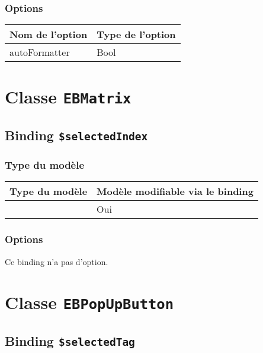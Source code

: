 \subsubsection{Options}

\begin{tabular}{|l|l|}
\hline
\textbf{Nom de l'option} & \textbf{Type de l'option}\\
\hline
autoFormatter & Bool\\
\hline
\end{tabular}







\section{Classe \texttt{EBMatrix}}

\subsection{Binding \texttt{\$selectedIndex}}

\subsubsection{Type du modèle}

\begin{tabular}{|l|l|}
\hline
\textbf{Type du modèle} & \textbf{Modèle modifiable via le binding}\\
\hline
 & Oui\\
\hline
\end{tabular}
\subsubsection{Options}

Ce binding n'a pas d'option.








\section{Classe \texttt{EBPopUpButton}}

\subsection{Binding \texttt{\$selectedTag}}


